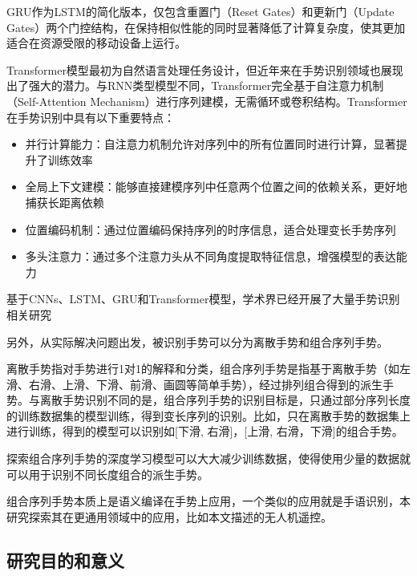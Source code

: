 GRU\cites{cho2014learning}作为LSTM的简化版本，仅包含重置门（Reset Gates）和更新门（Update Gates）两个门控结构，在保持相似性能的同时显著降低了计算复杂度，使其更加适合在资源受限的移动设备上运行。

Transformer模型\cites{vaswani2017attention}最初为自然语言处理任务设计，但近年来在手势识别领域也展现出了强大的潜力。与RNN类型模型不同，Transformer完全基于自注意力机制（Self-Attention Mechanism）进行序列建模，无需循环或卷积结构。Transformer在手势识别中具有以下重要特点：
\begin{itemize}
    \item 并行计算能力：自注意力机制允许对序列中的所有位置同时进行计算，显著提升了训练效率
    \item 全局上下文建模：能够直接建模序列中任意两个位置之间的依赖关系，更好地捕获长距离依赖
    \item 位置编码机制：通过位置编码保持序列的时序信息，适合处理变长手势序列
    \item 多头注意力：通过多个注意力头从不同角度提取特征信息，增强模型的表达能力
\end{itemize}

基于CNNs、LSTM、GRU和Transformer模型，学术界已经开展了大量手势识别相关研究\cites{jiang2022multi,chen2024bilstm,chen2024ultra,li2022research,kavarthapu2017hand,valarezo2021hand,d2020transformer,wang2024continuous}

另外，从实际解决问题出发，被识别手势可以分为离散手势\cites{jiang2022multi,chen2024bilstm,chen2024ultra,li2022research,valarezo2021hand,d2020transformer,wang2024continuous}和组合序列手势\cites{kavarthapu2017hand}。

离散手势指对手势进行1对1的解释和分类，组合序列手势是指基于离散手势（如左滑、右滑、上滑、下滑、前滑、画圆等简单手势），经过排列组合得到的派生手势。与离散手势识别不同的是，组合序列手势的识别目标是，只通过部分序列长度的训练数据集的模型训练，得到变长序列的识别。比如，只在离散手势的数据集上进行训练，得到的模型可以识别如[下滑, 右滑]，[上滑, 右滑，下滑]的组合手势。

探索组合序列手势的深度学习模型可以大大减少训练数据，使得使用少量的数据就可以用于识别不同长度组合的派生手势。

组合序列手势本质上是语义编译在手势上应用，一个类似的应用就是手语识别，本研究探索其在更通用领域中的应用，比如本文描述的无人机遥控。

\subsection{研究目的和意义}

